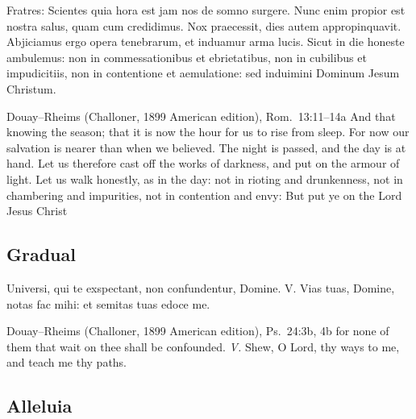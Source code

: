 \begin{latinproper}
Fratres: Scientes quia hora est jam nos de somno surgere. Nunc enim propior est nostra salus, quam cum credidimus. Nox praecessit, dies autem appropinquavit. Abjiciamus ergo opera tenebrarum, et induamur arma lucis. Sicut in die honeste ambulemus: non in commessationibus et ebrietatibus, non in cubilibus et impudicitiis, non in contentione et aemulatione: sed induimini Dominum Jesum Christum.
\end{latinproper}

\begin{englishwitness}{Douay--Rheims (Challoner, 1899 American edition), Rom.~13:11--14a}
And that knowing the season; that it is now the hour for us to rise from sleep. For now our salvation is nearer than when we believed. The night is passed, and the day is at hand. Let us therefore cast off the works of darkness, and put on the armour of light. Let us walk honestly, as in the day: not in rioting and drunkenness, not in chambering and impurities, not in contention and envy: But put ye on the Lord Jesus Christ
\end{englishwitness}

\subsection{Gradual}\label{proper-gradual}

\begin{latinproper}
Universi, qui te exspectant, non confundentur, Domine. \textnormal{V.} Vias tuas, Domine, notas fac mihi: et semitas tuas edoce me.
\end{latinproper}

\begin{englishwitness}{Douay--Rheims (Challoner, 1899 American edition), Ps.~24:3b, 4b}
for none of them that wait on thee shall be confounded. \textit{V.} Shew, O Lord, thy ways to me, and teach me thy paths.
\end{englishwitness}

\subsection{Alleluia}\label{proper-alleluia}


